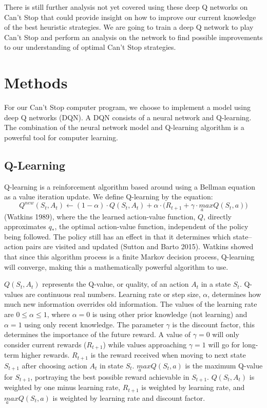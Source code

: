 \documentclass[12pt]{article}
\begin{document}
\begin{thesis}
There is still further analysis not yet covered using these deep Q networks on Can't Stop that could provide insight on how to improve our current knowledge of the best heuristic strategies.
We are going to train a deep Q network to play Can't Stop and perform an analysis on the network to find possible improvements to our understanding of optimal Can't Stop strategies.

\newpage

\section{Methods}\label{mets}

For our Can't Stop computer program, we choose to implement a model using deep Q networks (DQN).
A DQN consists of a neural network and Q-learning.
The combination of the neural network model and Q-learning algorithm is a powerful tool for computer learning.

\subsection{Q-Learning}\label{q-learning}

Q-learning is a reinforcement algorithm based around using a Bellman equation as a value iteration update.
We define Q-learning by the equation: \[Q^{new}(S_{t},A_{t})\leftarrow(1-\alpha)\cdot Q(S_{t},A_{t})+\alpha\cdot\bigg(R_{t+1}+\gamma\cdot\underset{a}maxQ(S_{t},a)\bigg)\] (Watkins 1989), where the the learned action-value function, \(Q\), directly approximates \(q_{*}\), the optimal action-value function, independent of the policy being followed.
The policy still has an effect in that it determines which state--action pairs are visited and updated (Sutton and Barto 2015).
Watkins showed that since this algorithm process is a finite Markov decision process, Q-learning will converge, making this a mathematically powerful algorithm to use.

\(Q(S_{t},A_{t})\) represents the Q-value, or quality, of an action \(A_{t}\) in a state \(S_{t}\).
Q-values are continuous real numbers.
Learning rate or step size, \(\alpha\), determines how much new information overrides old information.
The values of the learning rate are \(0\le\alpha\le1\), where \(\alpha=0\) is using other prior knowledge (not learning) and \(\alpha=1\) using only recent knowledge.
The parameter \(\gamma\) is the discount factor, this determines the importance of the future reward.
A value of \(\gamma=0\) will only consider current rewards (\(R_{t+1}\)) while values approaching \(\gamma=1\) will go for long-term higher rewards.
\(R_{t+1}\) is the reward received when moving to next state \(S_{t+1}\) after choosing action \(A_{t}\) in state \(S_{t}\).
\(\underset{a}maxQ(S_{t},a)\) is the maximum Q-value for \(S_{t+1}\), portraying the best possible reward achievable in \(S_{t+1}\).
\(Q(S_{t},A_{t})\) is weighted by one minus learning rate, \(R_{t+1}\) is weighted by learning rate, and \(\underset{a}maxQ(S_{t},a)\) is weighted by learning rate and discount factor.


\end{thesis}
\end{document}
